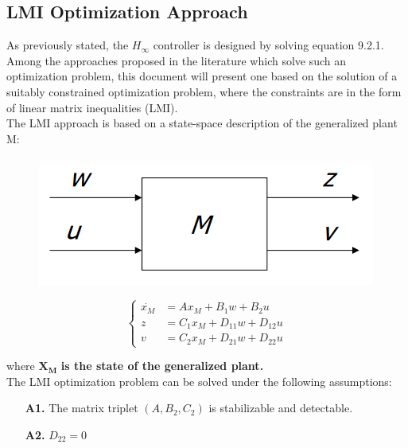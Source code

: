 \documentclass[a4paper,10pt,titlepage]{article}
\numberwithin{equation}{subsection}
\begin{document}
	\subsection{LMI Optimization Approach}
	As previously stated, the $H_\infty$ controller is designed by solving equation 9.2.1.\\
	\vspace{2pt}
	Among the approaches proposed in the literature which solve such an optimization problem, this document will present one based on the solution of a suitably constrained optimization problem, where the constraints are in the form of linear matrix inequalities (LMI).\\
	\vspace{2pt}
	The LMI approach is based on a state-space description of the generalized plant M:
	
	\begin{figure}[H]
		\begin{minipage}{0.3\textwidth}
			\centering
			\includegraphics[width=\linewidth]{images/generalized_plant_small.png}
			\label{fig:image13}
		\end{minipage}
		\centering
		\begin{minipage}{0.5\textwidth}
			\vspace{-20pt}
			\begin{equation}
				\left\{
				\begin{aligned}
					\dot{x_M} &= Ax_M + B_1w + B_2u \\
					z &= C_1x_M + D_{11}w + D_{12}u \\
					v &= C_2x_M + D_{21}w + D_{22}u
				\end{aligned}
				\right.
			\end{equation}
		\end{minipage}
	\end{figure}
	where $\bm{X_M}$ \textbf{is the state of the generalized plant.} \\
	\vspace{2pt}
	The LMI optimization problem can be solved under the following assumptions:
	\begin{enumerate}
		\item[\textbf{A1.}] The matrix triplet $(A,B_2,C_2)$ is stabilizable and detectable.
		\item[\textbf{A2.}] $D_{22} = 0$ 
	\end{enumerate}
	
\end{document}
